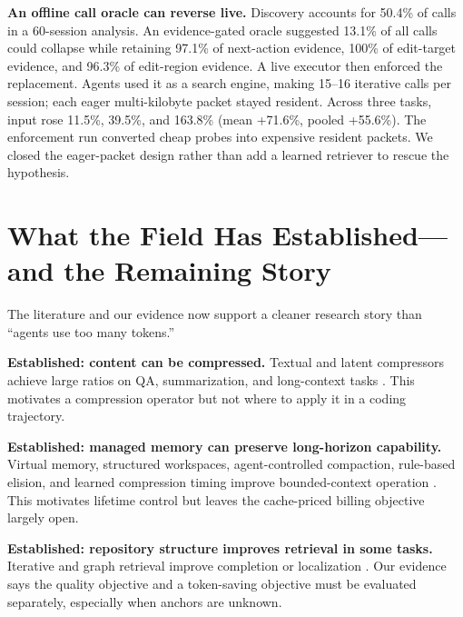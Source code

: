 \documentclass[10pt,twocolumn]{article}
\begin{document}
\textbf{An offline call oracle can reverse live.}  Discovery accounts for 50.4\% of calls in a
60-session analysis.  An evidence-gated oracle suggested 13.1\% of all calls could collapse while
retaining 97.1\% of next-action evidence, 100\% of edit-target evidence, and 96.3\% of edit-region
evidence.  A live executor then enforced the replacement.  Agents used it as a search engine, making
15--16 iterative calls per session; each eager multi-kilobyte packet stayed resident.  Across three
tasks, input rose 11.5\%, 39.5\%, and 163.8\% (mean +71.6\%, pooled +55.6\%).  The enforcement run
converted cheap probes into expensive resident packets.  We closed the eager-packet design rather
than add a learned retriever to rescue the hypothesis.


\section{What the Field Has Established---and the Remaining Story}

The literature and our evidence now support a cleaner research story than ``agents use too many
tokens.''

\textbf{Established: content can be compressed.}  Textual and latent compressors achieve large
ratios on QA, summarization, and long-context tasks \cite{jiang2023llmlingua,jiang2024longllmlingua,
pan2024llmlingua2,ge2024icae,xu2024recomp}.  This motivates a compression operator but not where to
apply it in a coding trajectory.

\textbf{Established: managed memory can preserve long-horizon capability.}  Virtual memory,
structured workspaces, agent-controlled compaction, rule-based elision, and learned compression timing
improve bounded-context operation \cite{packer2023memgpt,liu2026cat,verma2026focus,zhang2026autocompact,
fan2026harness,wang2026statecomp}.  This motivates lifetime control but leaves the cache-priced billing
objective largely open.

\textbf{Established: repository structure improves retrieval in some tasks.}  Iterative and graph
retrieval improve completion or localization \cite{zhang2023repocoder,liu2024graphcoder,
chen2025locagent}.  Our evidence says the quality objective and a token-saving objective must be
evaluated separately, especially when anchors are unknown.
\end{document}

